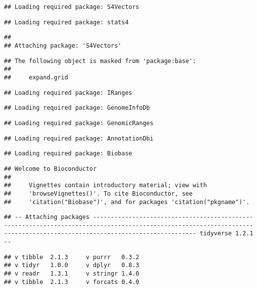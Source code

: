 \documentclass[]{article}
\begin{document}
\begin{verbatim}
## Loading required package: S4Vectors
\end{verbatim}

\begin{verbatim}
## Loading required package: stats4
\end{verbatim}

\begin{verbatim}
## 
## Attaching package: 'S4Vectors'
\end{verbatim}

\begin{verbatim}
## The following object is masked from 'package:base':
## 
##     expand.grid
\end{verbatim}

\begin{verbatim}
## Loading required package: IRanges
\end{verbatim}

\begin{verbatim}
## Loading required package: GenomeInfoDb
\end{verbatim}

\begin{verbatim}
## Loading required package: GenomicRanges
\end{verbatim}

\begin{verbatim}
## Loading required package: AnnotationDbi
\end{verbatim}

\begin{verbatim}
## Loading required package: Biobase
\end{verbatim}

\begin{verbatim}
## Welcome to Bioconductor
## 
##     Vignettes contain introductory material; view with
##     'browseVignettes()'. To cite Bioconductor, see
##     'citation("Biobase")', and for packages 'citation("pkgname")'.
\end{verbatim}

\begin{verbatim}
## -- Attaching packages ------------------------------------------------------------------------------------------------------------------------------------------------------------------------- tidyverse 1.2.1 --
\end{verbatim}

\begin{verbatim}
## v tibble  2.1.3     v purrr   0.3.2
## v tidyr   1.0.0     v dplyr   0.8.3
## v readr   1.3.1     v stringr 1.4.0
## v tibble  2.1.3     v forcats 0.4.0
\end{verbatim}
\end{document}
